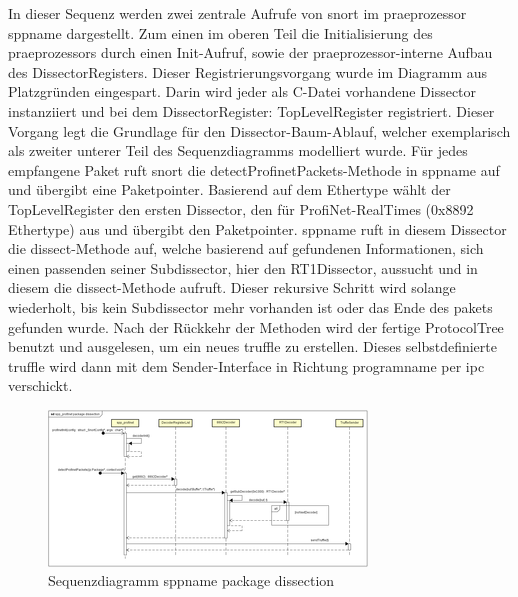 
In dieser Sequenz werden zwei zentrale Aufrufe von \gls{snort} im \gls{praeprozessor} \gls{sppname} dargestellt. Zum einen im oberen Teil die Initialisierung des \gls{praeprozessor}s durch einen Init-Aufruf, sowie der \gls{praeprozessor}-interne Aufbau des DissectorRegisters. Dieser Registrierungsvorgang wurde im Diagramm aus Platzgründen eingespart. Darin wird jeder als C-Datei vorhandene Dissector instanziiert und bei dem DissectorRegister: TopLevelRegister registriert. Dieser Vorgang legt die Grundlage für den Dissector-Baum-Ablauf, welcher exemplarisch als zweiter unterer Teil des Sequenzdiagramms modelliert wurde. Für jedes empfangene Paket ruft \gls{snort} die detectProfinetPackets-Methode in \gls{sppname} auf und übergibt eine Paketpointer. Basierend auf dem Ethertype wählt der TopLevelRegister den ersten Dissector, den für ProfiNet-RealTimes (0x8892 Ethertype) aus und übergibt den Paketpointer. \gls{sppname} ruft in diesem Dissector die dissect-Methode auf, welche basierend auf gefundenen Informationen, sich einen passenden seiner Subdissector, hier den RT1Dissector, aussucht und in diesem die dissect-Methode aufruft. Dieser rekursive Schritt wird solange wiederholt, bis kein Subdissector mehr vorhanden ist oder das Ende des \gls{paket}s gefunden wurde.
Nach der Rückkehr der Methoden wird der fertige ProtocolTree benutzt und ausgelesen, um ein neues \gls{truffle} zu erstellen. Dieses selbstdefinierte \gls{truffle} wird dann mit dem Sender-Interface in Richtung \gls{programname} per \gls{ipc} verschickt.

\begin{figure}[H]
  \centering
  \includegraphics[width=\textwidth]{../diagramimages/spp-profinet-package-dissection.png}
  \caption[Sequenzdiagramm \gls{sppname} package dissection]{Sequenzdiagramm \gls{sppname} package dissection}
  \label{fig:spp_sqd}
\end{figure} 